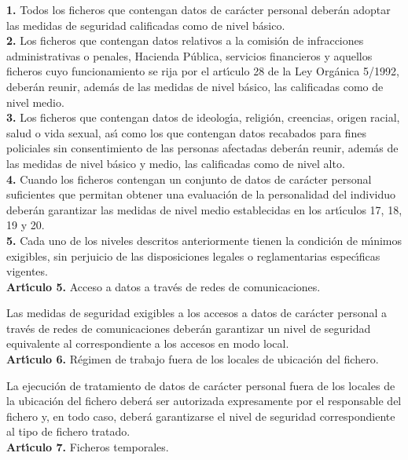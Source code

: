 {\bf 1.} Todos los ficheros que contengan datos de car\'acter personal 
deber\'an adoptar las medidas de seguridad calificadas como de nivel 
b\'asico.\\

{\bf 2.} Los ficheros que contengan datos relativos a la comisi\'on de 
infracciones administrativas o penales, Hacienda P\'ublica, servicios 
financieros y aquellos ficheros cuyo funcionamiento se rija por el art\'{\i}culo
28 de la Ley Org\'anica 5/1992, deber\'an reunir, adem\'as de las medidas de 
nivel b\'asico, las calificadas como de nivel medio.\\

{\bf 3.} Los ficheros que contengan datos de ideolog\'{\i}a, religi\'on, 
creencias, origen racial, salud o vida sexual, as\'{\i} como los que contengan 
datos recabados para fines policiales sin consentimiento de las personas 
afectadas deber\'an reunir, adem\'as de las medidas de nivel b\'asico y medio, 
las calificadas como de nivel alto.\\

{\bf 4.} Cuando los ficheros contengan un conjunto de datos de car\'acter 
personal suficientes que permitan obtener una evaluaci\'on de la personalidad 
del individuo deber\'an garantizar las medidas de nivel medio establecidas en 
los art\'{\i}culos 17, 18, 19 y 20.\\

{\bf 5.} Cada uno de los niveles descritos anteriormente tienen la condici\'on 
de m\'{\i}nimos exigibles, sin perjuicio de las disposiciones legales o 
reglamentarias espec\'{\i}ficas vigentes.
\vspace{0.3cm}\\
{\large {\bf Art\'{\i}culo 5.} Acceso a datos a trav\'es de redes de 
comunicaciones.}

Las medidas de seguridad exigibles a los accesos a datos de car\'acter personal 
a trav\'es de redes de comunicaciones deber\'an garantizar un nivel de 
seguridad equivalente al correspondiente a los accesos en modo local.
\vspace{0.3cm}\\
{\large {\bf Art\'{\i}culo 6.} R\'egimen de trabajo fuera de los locales de 
ubicaci\'on del fichero.}

La ejecuci\'on de tratamiento de datos de car\'acter personal fuera de los 
locales de la ubicaci\'on del fichero deber\'a ser autorizada expresamente por 
el responsable del fichero y, en todo caso, deber\'a garantizarse el nivel de 
seguridad correspondiente al tipo de fichero tratado.
\vspace{0.3cm}\\
{\large {\bf Art\'{\i}culo 7.} Ficheros temporales.}

